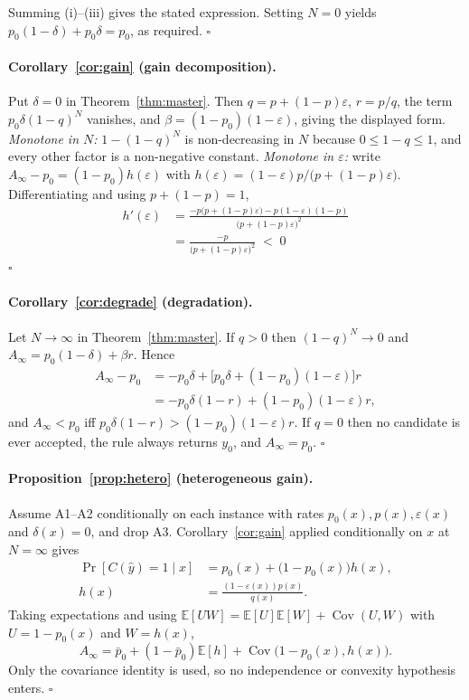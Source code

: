 \documentclass[11pt]{article}
\begin{document}
Summing (i)--(iii) gives the stated expression. Setting $N=0$ yields $p_0(1-\delta)+p_0\delta=p_0$, as required. \hfill$\square$

\paragraph{Corollary~\ref{cor:gain} (gain decomposition).}
Put $\delta=0$ in Theorem~\ref{thm:master}. Then $q=p+(1-p)\varepsilon$, $r=p/q$, the term $p_0\delta(1-q)^N$ vanishes, and $\beta=(1-p_0)(1-\varepsilon)$, giving the displayed form.
\emph{Monotone in $N$:} $1-(1-q)^N$ is non-decreasing in $N$ because $0\le1-q\le1$, and every other factor is a non-negative constant.
\emph{Monotone in $\varepsilon$:} write $A_\infty-p_0=(1-p_0)h(\varepsilon)$ with $h(\varepsilon)=(1-\varepsilon)p/\bigl(p+(1-p)\varepsilon\bigr)$. Differentiating and using $p+(1-p)=1$,
\[
\begin{aligned}
h'(\varepsilon)&=\frac{-p\bigl(p+(1-p)\varepsilon\bigr)-p(1-\varepsilon)(1-p)}{\bigl(p+(1-p)\varepsilon\bigr)^{2}}\\[2pt]
&=\frac{-p}{\bigl(p+(1-p)\varepsilon\bigr)^{2}}\;<\;0
\end{aligned}
\]
\hfill$\square$

\paragraph{Corollary~\ref{cor:degrade} (degradation).}
Let $N\to\infty$ in Theorem~\ref{thm:master}. If $q>0$ then $(1-q)^N\to0$ and $A_\infty=p_0(1-\delta)+\beta r$. Hence
\[
\begin{aligned}
A_\infty-p_0&=-p_0\delta+\bigl[p_0\delta+(1-p_0)(1-\varepsilon)\bigr]r\\[2pt]
&=-p_0\delta(1-r)+(1-p_0)(1-\varepsilon)r,
\end{aligned}
\]
and $A_\infty<p_0$ iff $p_0\delta(1-r)>(1-p_0)(1-\varepsilon)r$. If $q=0$ then no candidate is ever accepted, the rule always returns $y_0$, and $A_\infty=p_0$. \hfill$\square$

\paragraph{Proposition~\ref{prop:hetero} (heterogeneous gain).}
Assume A1--A2 conditionally on each instance with rates $p_0(x),p(x),\varepsilon(x)$ and $\delta(x)=0$, and drop A3. Corollary~\ref{cor:gain} applied conditionally on $x$ at $N=\infty$ gives
\[
\begin{aligned}
\Pr[C(\hat y){=}1\mid x]&=p_0(x)+\bigl(1-p_0(x)\bigr)h(x),\\
h(x)&=\tfrac{(1-\varepsilon(x))p(x)}{q(x)} .
\end{aligned}
\]
Taking expectations and using $\mathbb{E}[UW]=\mathbb{E}[U]\mathbb{E}[W]+\operatorname{Cov}(U,W)$ with $U=1-p_0(x)$ and $W=h(x)$,
\[A_\infty=\bar p_0+(1-\bar p_0)\mathbb{E}[h]+\operatorname{Cov}\bigl(1-p_0(x),h(x)\bigr).\]
Only the covariance identity is used, so no independence or convexity hypothesis enters. \hfill$\square$
\end{document}
